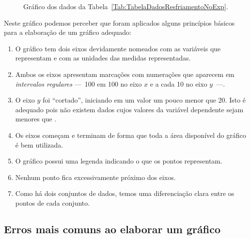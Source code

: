 \begin{figure*}[!htb]\forceversofloat
\centering
\caption{Gráfico dos dados da Tabela~\ref{Tab:TabelaDadosResfriamentoNoExp}.}
\label{Fig:GraficoResfriamentoNoExp}

\end{figure*}

Neste gráfico podemos perceber que foram aplicados alguns princípios básicos para a elaboração de um gráfico adequado:
\begin{enumerate}
	\item O gráfico tem dois eixos devidamente nomeados com as variáveis que representam e com as unidades das medidas representadas.
	\item Ambos os eixos apresentam marcações com numerações que aparecem em \emph{intervalos regulares} ---~100 em 100 no eixo $x$ e a cada 10 no eixo $y$~---.
	\item O eixo $y$ foi ``cortado'', iniciando em um valor um pouco menor que 20. Isto é adequado pois não existem dados cujos valores da variável dependente sejam menores que .
	\item Os eixos começam e terminam de forma que toda a área disponível do gráfico é bem utilizada.
	\item O gráfico possui uma legenda indicando o que os pontos representam.
	\item Nenhum ponto fica excessivamente próximo dos eixos.
	\item Como há dois conjuntos de dados, temos uma diferenciação clara entre os pontos de cada conjunto.
\end{enumerate}


\subsection{Erros mais comuns ao elaborar um gráfico}

